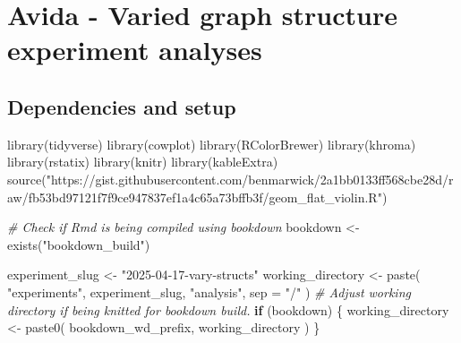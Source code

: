 \documentclass[
]{book}
\newenvironment{Shaded}{\begin{snugshade}}{\end{snugshade}}
\newcommand{\AttributeTok}[1]{\textcolor[rgb]{0.77,0.63,0.00}{#1}}
\newcommand{\CommentTok}[1]{\textcolor[rgb]{0.56,0.35,0.01}{\textit{#1}}}
\newcommand{\ControlFlowTok}[1]{\textcolor[rgb]{0.13,0.29,0.53}{\textbf{#1}}}
\newcommand{\FunctionTok}[1]{\textcolor[rgb]{0.00,0.00,0.00}{#1}}
\newcommand{\NormalTok}[1]{#1}
\newcommand{\OtherTok}[1]{\textcolor[rgb]{0.56,0.35,0.01}{#1}}
\newcommand{\StringTok}[1]{\textcolor[rgb]{0.31,0.60,0.02}{#1}}
\begin{document}
\hypertarget{avida---varied-graph-structure-experiment-analyses}{%
\chapter{Avida - Varied graph structure experiment analyses}\label{avida---varied-graph-structure-experiment-analyses}}

\hypertarget{dependencies-and-setup-1}{%
\section{Dependencies and setup}\label{dependencies-and-setup-1}}

\begin{Shaded}
\begin{Highlighting}[]
\FunctionTok{library}\NormalTok{(tidyverse)}
\FunctionTok{library}\NormalTok{(cowplot)}
\FunctionTok{library}\NormalTok{(RColorBrewer)}
\FunctionTok{library}\NormalTok{(khroma)}
\FunctionTok{library}\NormalTok{(rstatix)}
\FunctionTok{library}\NormalTok{(knitr)}
\FunctionTok{library}\NormalTok{(kableExtra)}
\FunctionTok{source}\NormalTok{(}\StringTok{"https://gist.githubusercontent.com/benmarwick/2a1bb0133ff568cbe28d/raw/fb53bd97121f7f9ce947837ef1a4c65a73bffb3f/geom\_flat\_violin.R"}\NormalTok{)}
\end{Highlighting}
\end{Shaded}

\begin{Shaded}
\begin{Highlighting}[]
\CommentTok{\# Check if Rmd is being compiled using bookdown}
\NormalTok{bookdown }\OtherTok{\textless{}{-}} \FunctionTok{exists}\NormalTok{(}\StringTok{"bookdown\_build"}\NormalTok{)}
\end{Highlighting}
\end{Shaded}

\begin{Shaded}
\begin{Highlighting}[]
\NormalTok{experiment\_slug }\OtherTok{\textless{}{-}} \StringTok{"2025{-}04{-}17{-}vary{-}structs"}
\NormalTok{working\_directory }\OtherTok{\textless{}{-}} \FunctionTok{paste}\NormalTok{(}
  \StringTok{"experiments"}\NormalTok{,}
\NormalTok{  experiment\_slug,}
  \StringTok{"analysis"}\NormalTok{,}
  \AttributeTok{sep =} \StringTok{"/"}
\NormalTok{)}
\CommentTok{\# Adjust working directory if being knitted for bookdown build.}
\ControlFlowTok{if}\NormalTok{ (bookdown) \{}
\NormalTok{  working\_directory }\OtherTok{\textless{}{-}} \FunctionTok{paste0}\NormalTok{(}
\NormalTok{    bookdown\_wd\_prefix,}
\NormalTok{    working\_directory}
\NormalTok{  )}
\NormalTok{\}}
\end{Highlighting}
\end{Shaded}
\end{document}
